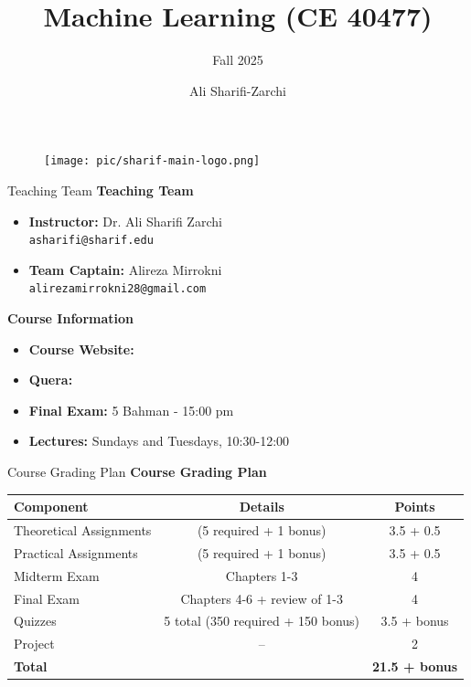 \documentclass[serif, aspectratio=169]{beamer}
\author{Ali Sharifi-Zarchi}
\title{Machine Learning (CE 40477)}
\subtitle{Fall 2025}
\institute{
    CE Department \\
    Sharif University of Technology
}
\begin{document}
\begin{frame}
    \titlepage
    \vspace*{-0.6cm}
    \begin{figure}[htpb]
    \begin{center}
        \texttt{[image: pic/sharif-main-logo.png]}
    \end{center}
\end{figure}

\end{frame}




\begin{frame}{Teaching Team}
\textbf{Teaching Team}
\begin{itemize}
    \item \textbf{Instructor:} Dr. Ali Sharifi Zarchi \\
          \texttt{asharifi@sharif.edu}
    \item \textbf{Team Captain:} Alireza Mirrokni \\
          \texttt{alirezamirrokni28@gmail.com}
\end{itemize}
\textbf{Course Information}
\begin{itemize}
    \item \textbf{Course Website:} \texttt{}
    \item \textbf{Quera:} \texttt{}
    \item \textbf{Final Exam:} 5 Bahman - 15:00 pm
    \item \textbf{Lectures:} Sundays and Tuesdays, 10:30-12:00
\end{itemize}
\end{frame}



\begin{frame}{Course Grading Plan}
\textbf{Course Grading Plan}

\begin{table}[h!]
\centering
\renewcommand{\arraystretch}{1.2}
\begin{tabular}{l c c}
\textbf{Component} & \textbf{Details} & \textbf{Points} \\ \hline
Theoretical Assignments &  (5 required + 1 bonus) & 3.5 + 0.5 \\
Practical Assignments &  (5 required + 1 bonus) & 3.5 + 0.5 \\
Midterm Exam & Chapters 1-3 & 4 \\
Final Exam & Chapters 4-6 + review of 1-3 & 4 \\
Quizzes & 5 total (350 required + 150 bonus) & 3.5 + bonus \\
Project & -- & 2 \\ \hline
\textbf{Total} &  & \textbf{21.5 + bonus} \\
\end{tabular}
\end{table}

\end{frame}
\end{document}

